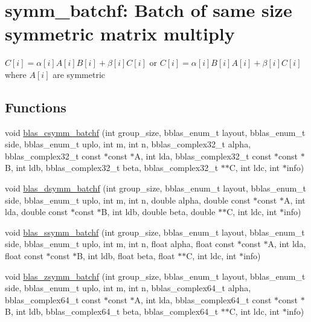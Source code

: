 \hypertarget{group__symm__batchf}{}\section{symm\+\_\+batchf\+: Batch of same size symmetric matrix multiply}
\label{group__symm__batchf}


$ C[i] = \alpha[i] A[i] B[i] + \beta[i] C[i] $ or $ C[i] = \alpha[i] B[i] A[i] + \beta[i] C[i] $ where $ A[i] $ are symmetric  


\subsection*{Functions}
\begin{DoxyCompactItemize}
\item 
void \mbox{\hyperlink{group__symm__batchf_ga3b7888d0a43cf26d146581c2615897e5}{blas\+\_\+csymm\+\_\+batchf}} (int group\+\_\+size, bblas\+\_\+enum\+\_\+t layout, bblas\+\_\+enum\+\_\+t side, bblas\+\_\+enum\+\_\+t uplo, int m, int n, bblas\+\_\+complex32\+\_\+t alpha, bblas\+\_\+complex32\+\_\+t const $\ast$const $\ast$A, int lda, bblas\+\_\+complex32\+\_\+t const $\ast$const $\ast$B, int ldb, bblas\+\_\+complex32\+\_\+t beta, bblas\+\_\+complex32\+\_\+t $\ast$$\ast$C, int ldc, int $\ast$info)
\item 
void \mbox{\hyperlink{group__symm__batchf_gac8e8bd6f38e2584eef2162a6f5b6464e}{blas\+\_\+dsymm\+\_\+batchf}} (int group\+\_\+size, bblas\+\_\+enum\+\_\+t layout, bblas\+\_\+enum\+\_\+t side, bblas\+\_\+enum\+\_\+t uplo, int m, int n, double alpha, double const $\ast$const $\ast$A, int lda, double const $\ast$const $\ast$B, int ldb, double beta, double $\ast$$\ast$C, int ldc, int $\ast$info)
\item 
void \mbox{\hyperlink{group__symm__batchf_gad73d6157baa333e8b81127d9fb0e73c7}{blas\+\_\+ssymm\+\_\+batchf}} (int group\+\_\+size, bblas\+\_\+enum\+\_\+t layout, bblas\+\_\+enum\+\_\+t side, bblas\+\_\+enum\+\_\+t uplo, int m, int n, float alpha, float const $\ast$const $\ast$A, int lda, float const $\ast$const $\ast$B, int ldb, float beta, float $\ast$$\ast$C, int ldc, int $\ast$info)
\item 
void \mbox{\hyperlink{group__symm__batchf_ga207ca7335041928197b6c1739e40cd46}{blas\+\_\+zsymm\+\_\+batchf}} (int group\+\_\+size, bblas\+\_\+enum\+\_\+t layout, bblas\+\_\+enum\+\_\+t side, bblas\+\_\+enum\+\_\+t uplo, int m, int n, bblas\+\_\+complex64\+\_\+t alpha, bblas\+\_\+complex64\+\_\+t const $\ast$const $\ast$A, int lda, bblas\+\_\+complex64\+\_\+t const $\ast$const $\ast$B, int ldb, bblas\+\_\+complex64\+\_\+t beta, bblas\+\_\+complex64\+\_\+t $\ast$$\ast$C, int ldc, int $\ast$info)
\end{DoxyCompactItemize}


